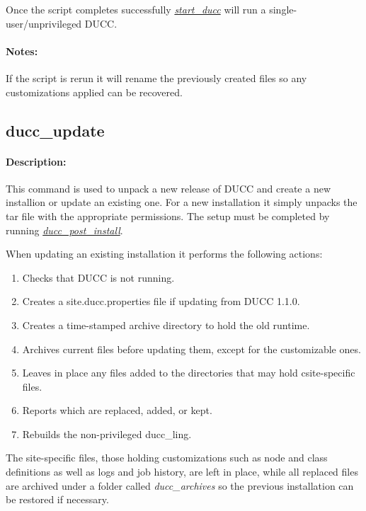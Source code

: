     Once the script completes successfully \hyperref[subsec:admin.start-ducc]{\em start\_ducc} will run a single-user/unprivileged DUCC.

    \paragraph{Notes:}
    If the script is rerun it will rename the previously created files so any customizations applied
    can be recovered.

\subsection{ducc\_update}
\label{subsec:admin.ducc-update}

    \paragraph{Description:}
        This command is used to unpack a new release of DUCC and create a new installion or update
        an existing one.
        For a new installation it simply unpacks the tar file with the appropriate permissions.
        The setup must be completed by running \hyperref[subsec:admin.ducc-post-install]{\em ducc\_post\_install}.

        When updating an existing installation it performs the following actions:
        \begin{enumerate}
          \item Checks that DUCC is not running.
          \item Creates a site.ducc.properties file if updating from DUCC 1.1.0.
          \item Creates a time-stamped archive directory to hold the old runtime.
          \item Archives current files before updating them, except for the customizable ones.
          \item Leaves in place any files added to the directories that may hold csite-specific files.
          \item Reports which are replaced, added, or kept.
          \item Rebuilds the non-privileged ducc\_ling.
        \end{enumerate}

        The site-specific files, those holding customizations such as node and class definitions
        as well as logs and job history, are left in place, 
        while all replaced files are archived under a folder called {\em ducc\_archives} 
        so the previous installation can be restored if necessary.

